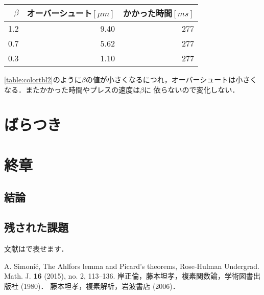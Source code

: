 \documentclass [dvipdfmx] {jsarticle}
\numberwithin{equation}{section}
\theoremstyle{definition} %
\theoremstyle{definition} %
\begin{document}
\begin{table}[h]
    \label{table:colortbl2}
    \centering
    \begin{tabular}{|r|r|r|}
     \hline
     $\beta$ & オーバーシュート$[\mu m]$ & かかった時間$[ms]$  \\
     \hline\hline
     1.2 & 9.40 & 277 \\
     0.7 & 5.62 & 277 \\
     0.3 & 1.10 & 277 \\
     \hline
    \end{tabular}
\end{table}
\eqref{table:colortbl2}のように$\beta$の値が小さくなるにつれ，オーバーシュートは小さくなる．またかかった時間やプレスの速度は$\beta$に
依らないので変化しない．
\section{ばらつき}
\section{終章}
\subsection{結論}
\subsection{残された課題}
文献は\cite{Si}で表せます．
\begin{thebibliography}{9}
 A. Simoni\u{c}, The Ahlfors lemma and Picard's theorems, 
Rose-Hulman Undergrad. Math. J. {\bf 16} (2015), no. 2, 113--136. 
 岸正倫，藤本坦孝，複素関数論，学術図書出版社 (1980)．
 藤本坦孝，複素解析，岩波書店 (2006)．


\end{thebibliography}
\end{document}
